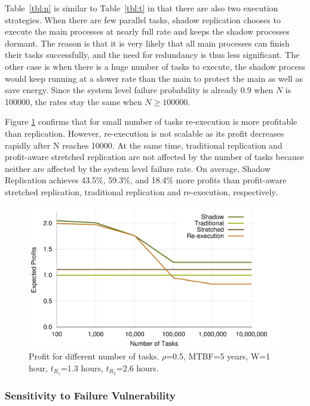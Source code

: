 Table~\ref{tbl:n} is similar to Table~\ref{tbl:t} in that there are also two execution strategies. When there are few parallel tasks, shadow
replication chooses to execute the main processes at nearly full rate and keeps
the shadow processes dormant. The
reason is that it is very likely that all main processes can finish
their tasks successfully, and the need for redundancy is thus less
significant. The other case is when there is a huge number of
tasks to execute, the shadow process would keep running at a slower rate than the main to protect the main as well as save energy. Since the system level failure probability is already 0.9 when $N$ is 100000, the rates stay the same when $N \ge 100000$.

Figure \ref{fig:n} confirms that for small number of tasks
re-execution is more profitable than replication. However, re-execution is not scalable
as its profit decreases rapidly after N reaches 10000. At the same time, traditional
replication and profit-aware stretched replication are not
affected by the number of tasks because neither are affected by the
system level failure rate. On average, Shadow Replication achieves 43.5\%, 59.3\%, and 18.4\%
more profits than profit-aware stretched replication, traditional replication and re-execution, respectively. 

\begin{figure}[!h]	
	\begin{center}
			\includegraphics[width=\columnwidth]{Figures/n_profit}
	\end{center}
	\caption{Profit for different number of tasks. $\rho$=0.5, MTBF=5 years, W=1 hour, $t_{R_1}$=1.3 hours, $t_{R_2}$=2.6 hours.}
	\label{fig:n}
\end{figure}

\subsubsection{Sensitivity to Failure Vulnerability}

